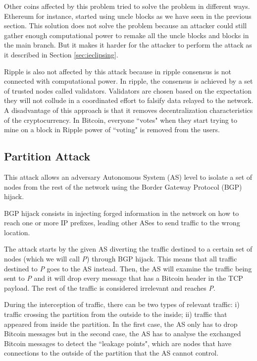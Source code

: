 Other coins affected by this problem tried to solve the problem in different ways. Ethereum for instance, started using uncle blocks as we have seen in the previous section. This solution does not solve the problem because an attacker could still gather enough computational power to remake all the uncle blocks and blocks in the main branch. But it makes it harder for the attacker to perform the attack as it described in Section \ref{sec:ieclipsing}.

Ripple is also not affected by this attack because in ripple consensus is not connected with computational power. In ripple, the consensus is achieved by a set of trusted nodes called validators. Validators are chosen based on the expectation they will not collude in a coordinated effort to falsify data relayed to the network. A disadvantage of this approach is that it removes decentralization characteristics of the cryptocurrency. In Bitcoin, everyone ``votes" when they start trying to mine on a block in Ripple power of ``voting" is removed from the users.


\subsection{Partition Attack}
This attack allows an adversary Autonomous System (AS) level to isolate a set of nodes from the rest of the network using the Border Gateway Protocol (BGP) hijack.

BGP hijack consists in injecting forged information in the network on how to reach one or more IP prefixes, leading other ASes to send traffic to the wrong location.

The attack starts by the given AS diverting the traffic destined to a certain set of nodes (which we will call \textit{P}) through BGP hijack. This means that all traffic destined to \textit{P} goes to the AS instead. Then, the AS will examine the traffic being sent to \textit{P} and it will drop every message that has a Bitcoin header in the TCP payload. The rest of the traffic is considered irrelevant and reaches \textit{P}.

During the interception of traffic, there can be two types of relevant traffic: i) traffic crossing the partition from the outside to the inside; ii) traffic that appeared from inside the partition. In the first case, the AS only has to drop Bitcoin messages but in the second case, the AS has to analyse the exchanged Bitcoin messages to detect the ``leakage points", which are nodes that have connections to the outside of the partition that the AS cannot control.

